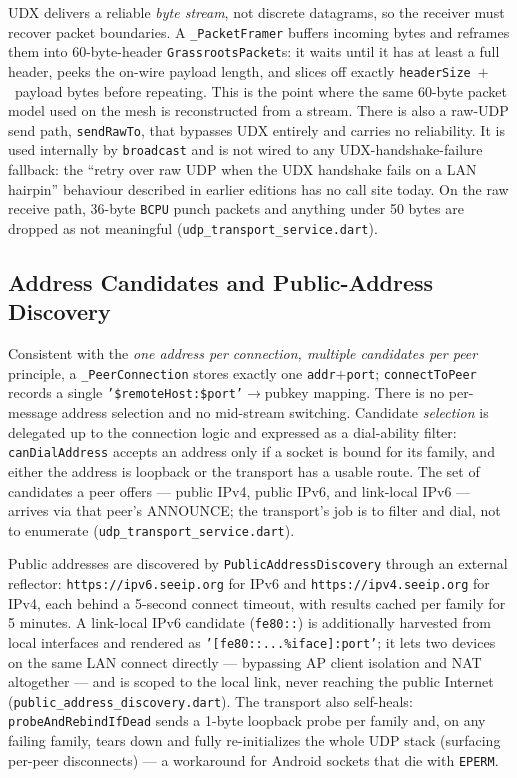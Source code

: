 \documentclass[11pt]{report}
\newcommand{\code}[1]{\texttt{\small #1}}
\begin{document}
UDX delivers a reliable \emph{byte stream}, not discrete datagrams, so the receiver must recover packet boundaries. A \code{\_PacketFramer} buffers incoming bytes and reframes them into 60-byte-header \code{GrassrootsPacket}s: it waits until it has at least a full header, peeks the on-wire payload length, and slices off exactly \code{headerSize}~$+$~payload bytes before repeating. This is the point where the same 60-byte packet model used on the mesh is reconstructed from a stream. There is also a raw-UDP send path, \code{sendRawTo}, that bypasses UDX entirely and carries no reliability. It is used internally by \code{broadcast} and is not wired to any UDX-handshake-failure fallback: the ``retry over raw UDP when the UDX handshake fails on a LAN hairpin'' behaviour described in earlier editions has no call site today. On the raw receive path, 36-byte \code{BCPU} punch packets and anything under 50 bytes are dropped as not meaningful (\code{udp_transport_service.dart}).

\subsection{Address Candidates and Public-Address Discovery}

Consistent with the \emph{one address per connection, multiple candidates per peer} principle, a \code{\_PeerConnection} stores exactly one \code{addr}$+$\code{port}; \code{connectToPeer} records a single \code{'\$remoteHost:\$port'}$\rightarrow$pubkey mapping. There is no per-message address selection and no mid-stream switching. Candidate \emph{selection} is delegated up to the connection logic and expressed as a dial-ability filter: \code{canDialAddress} accepts an address only if a socket is bound for its family, and either the address is loopback or the transport has a usable route. The set of candidates a peer offers --- public IPv4, public IPv6, and link-local IPv6 --- arrives via that peer's ANNOUNCE; the transport's job is to filter and dial, not to enumerate (\code{udp_transport_service.dart}).

Public addresses are discovered by \code{PublicAddressDiscovery} through an external reflector: \code{https://ipv6.seeip.org} for IPv6 and \code{https://ipv4.seeip.org} for IPv4, each behind a 5-second connect timeout, with results cached per family for 5 minutes. A link-local IPv6 candidate (\code{fe80::}) is additionally harvested from local interfaces and rendered as \code{'[fe80::...\%iface]:port'}; it lets two devices on the same LAN connect directly --- bypassing AP client isolation and NAT altogether --- and is scoped to the local link, never reaching the public Internet (\code{public_address_discovery.dart}). The transport also self-heals: \code{probeAndRebindIfDead} sends a 1-byte loopback probe per family and, on any failing family, tears down and fully re-initializes the whole UDP stack (surfacing per-peer disconnects) --- a workaround for Android sockets that die with \code{EPERM}.
\end{document}
